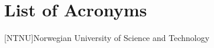 \chapter*{List of Acronyms}

\begin{acronym}[NTNU]
    [NTNU]{Norwegian University of Science and Technology}
\end{acronym}